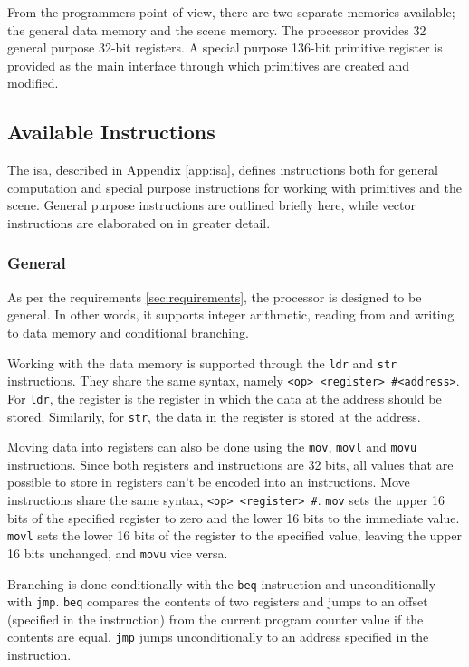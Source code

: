 From the programmers point of view, there are two separate memories available; the general data memory and the scene memory.
The processor provides 32 general purpose 32-bit registers.
A special purpose 136-bit primitive register is provided as the main interface through which primitives are created and modified.

\subsection{Available Instructions}

The \vthreek \gls{isa}, described in Appendix \ref{app:isa}, defines instructions both for general computation and special purpose instructions for working with primitives and the scene.
General purpose instructions are outlined briefly here, while vector instructions are elaborated on in greater detail.

\subsubsection{General}

As per the requirements \ref{sec:requirements}, the \vthreek processor is designed to be general.
In other words, it supports integer arithmetic, reading from and writing to data memory and conditional branching.

Working with the data memory is supported through the \texttt{ldr} and \texttt{str} instructions.
They share the same syntax, namely \texttt{<op> <register> \#<address>}.
For \texttt{ldr}, the register is the register in which the data at the address should be stored.
Similarily, for \texttt{str}, the data in the register is stored at the address.

Moving data into registers can also be done using the \texttt{mov}, \texttt{movl} and \texttt{movu} instructions.
Since both registers and instructions are 32 bits, all values that are possible to store in registers can't be encoded into an instructions.
Move instructions share the same syntax, \texttt{<op> <register> \#<16-bit immediate>}.
\texttt{mov} sets the upper 16 bits of the specified register to zero and the lower 16 bits to the immediate value.
\texttt{movl} sets the lower 16 bits of the register to the specified value, leaving the upper 16 bits unchanged, and \texttt{movu} vice versa.

Branching is done conditionally with the \texttt{beq} instruction and unconditionally with \texttt{jmp}.
\texttt{beq} compares the contents of two registers and jumps to an offset (specified in the instruction) from the current program counter value if the contents are equal.
\texttt{jmp} jumps unconditionally to an address specified in the instruction.


